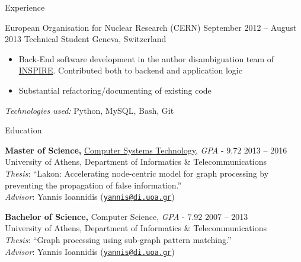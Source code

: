 \documentclass{resume}
\begin{document}
\begin{rSection}{Experience}
\begin{rSubsection}
  {European Organisation for Nuclear Research (CERN)}
  {September 2012 -- August 2013}
  {Technical Student}
  {Geneva, Switzerland}
  \begin{itemize}
   \item Back-End software development in the author disambiguation team of \href{http://inspirehep.net/}{INSPIRE}. Contributed both to backend and application logic
   \item Substantial refactoring/documenting of existing code
  \end{itemize}
    \textit{Technologies used:} Python, MySQL, Bash, Git
\end{rSubsection}





\end{rSection}


\begin{rSection}{Education}

{\bf Master of Science,} 
\href{http://www.di.uoa.gr/eng/postgraduate/eng_specialization_3}{Computer 
Systems Technology}, \textit{GPA} - $9.72$ \hfill {2013 -- 2016 } \\
University of Athens, Department of Informatics \& Telecommunications \\
\textit{Thesis}: ``Lakon: Accelerating node-centric model for graph processing by 
preventing the propagation of false information.''  \\
\textit{Advisor}: Yannis Ioannidis 
  (\href{mailto:yannis@di.uoa.gr}{\nolinkurl{yannis@di.uoa.gr}}) 

{\bf Bachelor of Science,} Computer Science, \textit{GPA} - $7.92$ \hfill {2007 -- 2013}  \\
University of Athens, Department of Informatics \& Telecommunications \\
\textit{Thesis}: ``Graph processing using sub-graph pattern matching.''  \\
\textit{Advisor}: Yannis Ioannidis 
  (\href{mailto:yannis@di.uoa.gr}{\nolinkurl{yannis@di.uoa.gr}})

\end{rSection}
\end{document}
